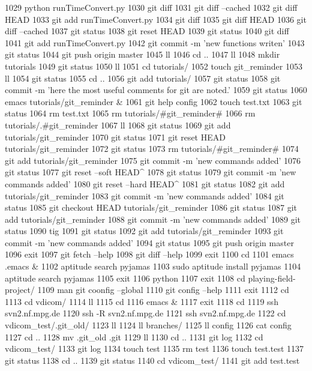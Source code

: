  1029  python runTimeConvert.py
 1030  git diff
 1031  git diff --cached
 1032  git diff HEAD
 1033  git add runTimeConvert.py
 1034  git diff
 1035  git diff HEAD
 1036  git diff --cached
 1037  git status
 1038  git reset HEAD
 1039  git status
 1040  git diff
 1041  git add runTimeConvert.py
 1042  git commit -m 'new functions writen'
 1043  git status
 1044  git push origin master
 1045  ll
 1046  cd ..
 1047  ll
 1048  mkdir tutorials
 1049  git status
 1050  ll
 1051  cd tutorials/
 1052  touch git_reminder
 1053  ll
 1054  git status
 1055  cd ..
 1056  git add tutorials/
 1057  git status
 1058  git commit -m 'here the most useful comments for git are noted.'
 1059  git status
 1060  emacs tutorials/git_reminder &
 1061  git help config
 1062  touch test.txt
 1063  git status
 1064  rm test.txt 
 1065  rm tutorials/#git_reminder# 
 1066  rm tutorials/.#git_reminder 
 1067  ll
 1068  git status
 1069  git add tutorials/git_reminder
 1070  git status
 1071  git reset HEAD tutorials/git_reminder
 1072  git status
 1073  rm tutorials/#git_reminder# 
 1074  git add tutorials/git_reminder
 1075  git commit -m 'new commands added'
 1076  git status
 1077  git reset --soft HEAD^
 1078  git status
 1079  git commit -m 'new commands added'
 1080  git reset --hard HEAD^
 1081  git status
 1082  git add tutorials/git_reminder
 1083  git commit -m 'new commands added'
 1084  git status
 1085  git checkout HEAD tutorials/git_reminder
 1086  git status
 1087  git add tutorials/git_reminder
 1088  git commit -m 'new commands added'
 1089  git status
 1090  tig
 1091  git status
 1092  git add tutorials/git_reminder
 1093  git commit -m 'new commands added'
 1094  git status
 1095  git push origin master
 1096  exit
 1097  git fetch --help
 1098  git diff --help
 1099  exit
 1100  cd
 1101  emacs .emacs &
 1102  aptitude search pyjamas
 1103  sudo aptitude install pyjamas
 1104  aptitude search pyjamas
 1105  exit
 1106  python
 1107  exit
 1108  cd playing-field-project/
 1109  man git coonfig --global 
 1110  git config --help
 1111  exit
 1112  cd
 1113  cd vdicom/
 1114  ll
 1115  cd
 1116  emacs &
 1117  exit
 1118  cd
 1119  ssh svn2.nf.mpg.de
 1120  ssh -R svn2.nf.mpg.de
 1121  ssh svn2.nf.mpg.de
 1122  cd vdicom_test/.git_old/
 1123  ll
 1124  ll branches/
 1125  ll config 
 1126  cat config 
 1127  cd ..
 1128  mv .git_old .git
 1129  ll
 1130  cd ..
 1131  git log
 1132  cd vdicom_test/
 1133  git log
 1134  touch test
 1135  rm test 
 1136  touch test.test
 1137  git status
 1138  cd ..
 1139  git status
 1140  cd vdicom_test/
 1141  git add test.test
